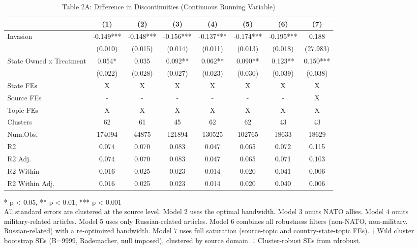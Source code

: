 \begin{table}[!t]
\caption{Table 2A: Difference in Discontinuities (Continuous Running Variable)} 
\fontsize{12.0pt}{14.4pt}\selectfont
\begin{tabular*}{\linewidth}{@{\extracolsep{\fill}}lccccccc}
\toprule
  & (1) & (2) & (3) & (4) & (5) & (6) & (7) \\ 
\midrule\addlinespace[2.5pt]
Invasion & -0.149*** & -0.148*** & -0.156*** & -0.137*** & -0.174*** & -0.195*** & 0.188 \\ 
 & (0.010) & (0.015) & (0.014) & (0.011) & (0.013) & (0.018) & (27.983) \\ 
State Owned x Treatment & 0.054* & 0.035 & 0.092** & 0.062** & 0.090** & 0.123** & 0.150*** \\ 
{} & {(0.022)} & {(0.028)} & {(0.027)} & {(0.023)} & {(0.030)} & {(0.039)} & {(0.038)} \\ 
State FEs & X & X & X & X & X & X & X \\ 
Source FEs & - & - & - & - & - & - & X \\ 
Topic FEs & X & X & X & X & X & X & X \\ 
Clusters & 62 & 61 & 45 & 62 & 62 & 43 & 43 \\ 
Num.Obs. & 174094 & 44875 & 121894 & 130525 & 102765 & 18633 & 18629 \\ 
R2 & 0.074 & 0.070 & 0.083 & 0.047 & 0.065 & 0.072 & 0.115 \\ 
R2 Adj. & 0.074 & 0.070 & 0.083 & 0.047 & 0.065 & 0.071 & 0.103 \\ 
R2 Within & 0.016 & 0.025 & 0.023 & 0.014 & 0.020 & 0.041 & 0.006 \\ 
R2 Within Adj. & 0.016 & 0.025 & 0.023 & 0.014 & 0.020 & 0.040 & 0.006 \\ 
\bottomrule
\end{tabular*}
\begin{minipage}{\linewidth}
* p < 0.05, ** p < 0.01, *** p < 0.001\\
All standard errors are clustered at the source level. Model 2 uses the optimal
bandwidth. Model 3 omits NATO allies. Model 4 omits military-related articles.
Model 5 uses only Russian-related articles. Model 6 combines all robustness
filters (non-NATO, non-military, Russian-related) with a re-optimized bandwidth.
Model 7 uses full saturation (source-topic and country-state-topic FEs). † Wild
cluster bootstrap SEs (B=9999, Rademacher, null imposed), clustered by source
domain. ‡ Cluster-robust SEs from rdrobust.\\
\end{minipage}
\end{table}

